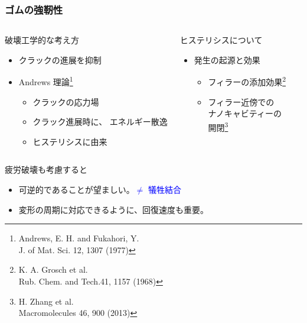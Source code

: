 \documentclass[12pt, dvipdfmx]{beamer}
\begin{document}
\begin{frame}
	\frametitle{ゴムの強靭性}
	\vspace{-3mm}
		\begin{columns}[totalwidth=\textwidth]
				\begin{exampleblock}{破壊工学的な考え方}
					\begin{itemize}
						\item クラックの進展を\alert{抑制}
						\item Andrews 理論\footnote{
							\scriptsize
				{Andrews, E. H. and Fukahori, Y. \\J. of Mat. Sci. 12, 1307 (1977)}
						}
							\begin{itemize}
								\item クラックの応力場
								\item クラック進展時に、{\color{red} エネルギー散逸}
								\item \alert{ヒステリシスに由来}
							\end{itemize}	
					\end{itemize}
				\end{exampleblock}
				
			\begin{block}{ヒステリシスについて}
				\begin{itemize}
					\item 発生の起源と効果
					\begin{itemize}
						\item フィラーの添加効果\footnote{
							\scriptsize{K. A. Grosch et al. \\Rub. Chem. and Tech.41, 1157 (1968)}
						}
						\item フィラー近傍での\\ナノキャビティーの\\開閉\footnote{
							\scriptsize{H. Zhang et al. \\Macromolecules 46, 900 (2013)}
						}
					\end{itemize}
				\end{itemize}
			\end{block}
		\end{columns}
		\begin{alertblock}{疲労破壊も考慮すると}
			\begin{itemize}
				\item \alert{可逆的}であることが望ましい。\textcolor{blue}{$\neq$ 犠牲結合}
				\item 変形の周期に対応できるように、\alert{回復速度}も重要。
			\end{itemize}
		\end{alertblock}
\end{frame}
\end{document}
